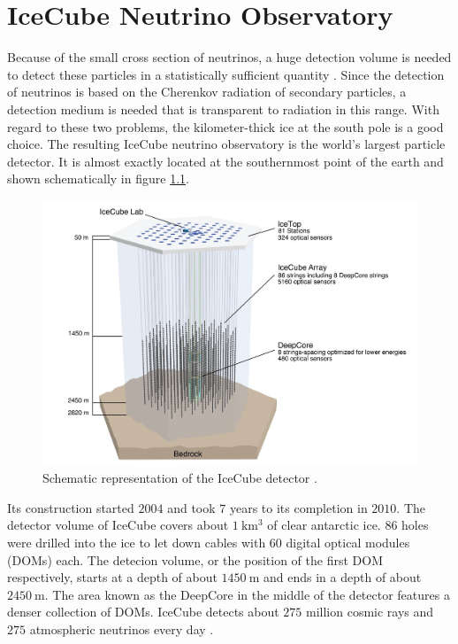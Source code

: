 \chapter{IceCube Neutrino Observatory}

Because of the small cross section of neutrinos, a huge detection volume is needed to detect these particles in a statistically sufficient quantity \cite{cross_n}.
Since the detection of neutrinos is based on the Cherenkov radiation of secondary particles, a detection medium is needed that is transparent to radiation in this range.
With regard to these two problems, the kilometer-thick ice at the south pole is a good choice.
The resulting IceCube neutrino observatory is the world's largest particle detector.
It is almost exactly located at the southernmost point of the earth and shown schematically in figure \ref{fig:icecube}.

\begin{figure}
    \centering
    \includegraphics[width=\linewidth]{Plots/01_7_icecube/IceCube-Array.jpg}
    \caption{Schematic representation of the IceCube detector \cite{icecube_website}.}
    \label{fig:icecube}
\end{figure}

Its construction started $\num{2004}$ and took $\num{7}$ years to its completion in $\num{2010}$.
The detector volume of IceCube covers about $\SI{1}{\kilo\meter\tothe{3}}$ of clear antarctic ice.
$\num{86}$ holes were drilled into the ice to let down cables with $\num{60}$ digital optical modules (DOMs) each.
The detecion volume, or the position of the first DOM respectively, starts at a depth of about $\SI{1450}{\meter}$ and ends in a depth of about $\SI{2450}{\meter}$.
The area known as the DeepCore in the middle of the detector features a denser collection of DOMs.
IceCube detects about $\num{275}$ million cosmic rays and $\num{275}$ atmospheric neutrinos every day \cite{icecube_website}.

